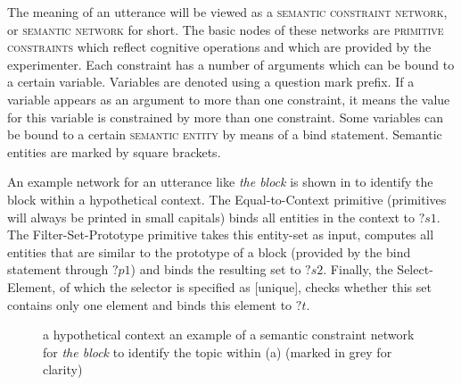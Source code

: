 The meaning of an utterance will be viewed as a \textsc{semantic
  constraint network}, or \textsc{semantic network} for short. The basic
nodes of these networks are \textsc{primitive
  constraints} which reflect cognitive
operations and which are provided by the experimenter.  Each
constraint has a number of arguments which can be bound to a certain
variable. Variables are denoted using a question mark prefix. If a
variable appears as an argument to more than one constraint, it means
the value for this variable is constrained by more than one
constraint. Some variables can be bound to a certain \textsc{semantic
  entity} by means of a bind
statement. Semantic entities are marked by square brackets.

An example network for an utterance like \textit{the block} is shown in
 to identify the block within a
hypothetical context. The {\sc Equal-to-Context} primitive (primitives
will always be printed in small capitals) binds all entities in the
context to $?s1$. The {\sc Filter-Set-Proto\-type} primitive takes
this entity-set as input, computes all entities that are similar to
the prototype of a block (provided by the bind statement through $?p1$)
and binds the resulting set to $?s2$. Finally, the {\sc
  Select-Element}, of which the selector is specified as [unique],
checks whether this set contains only one element and binds this
element to $?t$.

\begin{figure}
\centering
{}
\caption[Example semantic constraint network for \textit{the block}]{ a hypothetical context 
  an example of a semantic constraint network for \textit{the block} to
  identify the topic within (a) (marked in grey for clarity)}
\label{f:context-and-network}
\end{figure}

